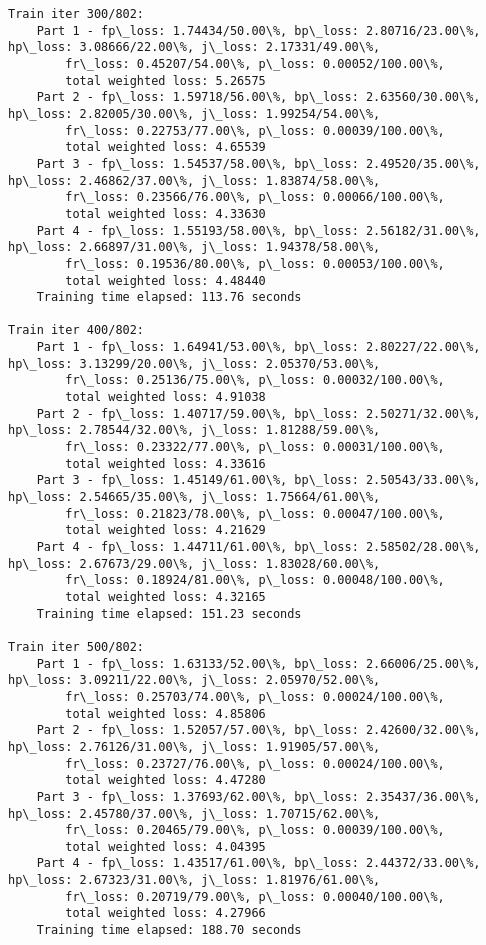 \documentclass[11pt]{article}
\begin{document}
\begin{Verbatim}[commandchars=\\\{\}]
Train iter 300/802:
	Part 1 - fp\_loss: 1.74434/50.00\%, bp\_loss: 2.80716/23.00\%, hp\_loss: 3.08666/22.00\%, j\_loss: 2.17331/49.00\%, 
		fr\_loss: 0.45207/54.00\%, p\_loss: 0.00052/100.00\%, 
		total weighted loss: 5.26575
	Part 2 - fp\_loss: 1.59718/56.00\%, bp\_loss: 2.63560/30.00\%, hp\_loss: 2.82005/30.00\%, j\_loss: 1.99254/54.00\%, 
		fr\_loss: 0.22753/77.00\%, p\_loss: 0.00039/100.00\%, 
		total weighted loss: 4.65539
	Part 3 - fp\_loss: 1.54537/58.00\%, bp\_loss: 2.49520/35.00\%, hp\_loss: 2.46862/37.00\%, j\_loss: 1.83874/58.00\%, 
		fr\_loss: 0.23566/76.00\%, p\_loss: 0.00066/100.00\%, 
		total weighted loss: 4.33630
	Part 4 - fp\_loss: 1.55193/58.00\%, bp\_loss: 2.56182/31.00\%, hp\_loss: 2.66897/31.00\%, j\_loss: 1.94378/58.00\%, 
		fr\_loss: 0.19536/80.00\%, p\_loss: 0.00053/100.00\%, 
		total weighted loss: 4.48440
	Training time elapsed: 113.76 seconds

Train iter 400/802:
	Part 1 - fp\_loss: 1.64941/53.00\%, bp\_loss: 2.80227/22.00\%, hp\_loss: 3.13299/20.00\%, j\_loss: 2.05370/53.00\%, 
		fr\_loss: 0.25136/75.00\%, p\_loss: 0.00032/100.00\%, 
		total weighted loss: 4.91038
	Part 2 - fp\_loss: 1.40717/59.00\%, bp\_loss: 2.50271/32.00\%, hp\_loss: 2.78544/32.00\%, j\_loss: 1.81288/59.00\%, 
		fr\_loss: 0.23322/77.00\%, p\_loss: 0.00031/100.00\%, 
		total weighted loss: 4.33616
	Part 3 - fp\_loss: 1.45149/61.00\%, bp\_loss: 2.50543/33.00\%, hp\_loss: 2.54665/35.00\%, j\_loss: 1.75664/61.00\%, 
		fr\_loss: 0.21823/78.00\%, p\_loss: 0.00047/100.00\%, 
		total weighted loss: 4.21629
	Part 4 - fp\_loss: 1.44711/61.00\%, bp\_loss: 2.58502/28.00\%, hp\_loss: 2.67673/29.00\%, j\_loss: 1.83028/60.00\%, 
		fr\_loss: 0.18924/81.00\%, p\_loss: 0.00048/100.00\%, 
		total weighted loss: 4.32165
	Training time elapsed: 151.23 seconds

Train iter 500/802:
	Part 1 - fp\_loss: 1.63133/52.00\%, bp\_loss: 2.66006/25.00\%, hp\_loss: 3.09211/22.00\%, j\_loss: 2.05970/52.00\%, 
		fr\_loss: 0.25703/74.00\%, p\_loss: 0.00024/100.00\%, 
		total weighted loss: 4.85806
	Part 2 - fp\_loss: 1.52057/57.00\%, bp\_loss: 2.42600/32.00\%, hp\_loss: 2.76126/31.00\%, j\_loss: 1.91905/57.00\%, 
		fr\_loss: 0.23727/76.00\%, p\_loss: 0.00024/100.00\%, 
		total weighted loss: 4.47280
	Part 3 - fp\_loss: 1.37693/62.00\%, bp\_loss: 2.35437/36.00\%, hp\_loss: 2.45780/37.00\%, j\_loss: 1.70715/62.00\%, 
		fr\_loss: 0.20465/79.00\%, p\_loss: 0.00039/100.00\%, 
		total weighted loss: 4.04395
	Part 4 - fp\_loss: 1.43517/61.00\%, bp\_loss: 2.44372/33.00\%, hp\_loss: 2.67323/31.00\%, j\_loss: 1.81976/61.00\%, 
		fr\_loss: 0.20719/79.00\%, p\_loss: 0.00040/100.00\%, 
		total weighted loss: 4.27966
	Training time elapsed: 188.70 seconds


\end{Verbatim}
\end{document}
